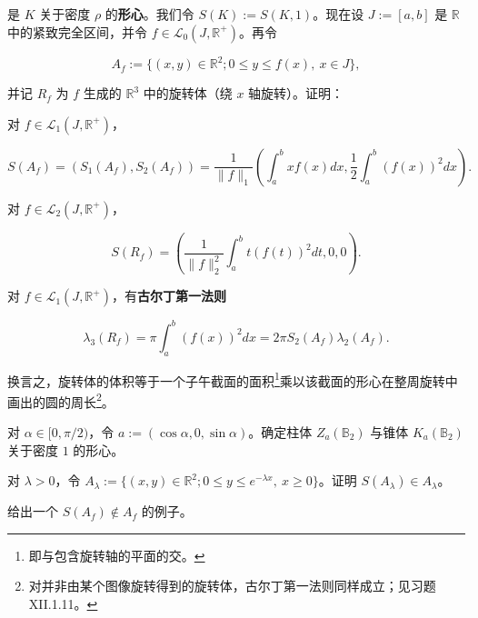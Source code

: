 \begin{exercises}
是 $ K $ 关于密度 $ \rho $ 的\textbf{形心}。我们令 $ S(K) := S(K,1) $。现在设 $ J := [a,b] $ 是 $ \mathbb{R} $ 中的紧致完全区间，并令 $ f \in \mathcal{L}_0(J, \mathbb{R}^+) $。再令

\[
A_f := \{ (x,y) \in \mathbb{R}^2 ; 0 \le y \le f(x),\ x \in J \} ,
\]

并记 $ R_f $ 为 $ f $ 生成的 $ \mathbb{R}^3 $ 中的旋转体（绕 $ x $ 轴旋转）。证明：

\begin{items}
\item

对 $ f \in \mathcal{L}_1(J, \mathbb{R}^+) $，

\[
S(A_f) = (S_1(A_f), S_2(A_f)) = \frac{1}{\|f\|_1} \left( \int_a^b xf(x) dx, \frac{1}{2}\int_a^b (f(x))^2 dx \right) .
\]
\item

对 $ f \in \mathcal{L}_2(J, \mathbb{R}^+) $，

\[
S(R_f) = \left( \frac{1}{\|f\|_2^2} \int_a^b t(f(t))^2 dt, 0, 0 \right) .
\]
\item

对 $ f \in \mathcal{L}_1(J, \mathbb{R}^+) $，有\textbf{古尔丁第一法则}

\[
\lambda_3(R_f) = \pi \int_a^b (f(x))^2 dx = 2\pi S_2(A_f)\lambda_2(A_f) .
\]

换言之，旋转体的体积等于一个子午截面的面积\footnote{即与包含旋转轴的平面的交。}乘以该截面的形心在整周旋转中画出的圆的周长\footnote{对并非由某个图像旋转得到的旋转体，古尔丁第一法则同样成立；见习题 XII.1.11。}。

\end{items}

\item

\begin{items}
\item

对 $ \alpha \in [0,\pi/2) $，令 $ a := (\cos\alpha, 0, \sin\alpha) $。确定柱体 $ Z_a(\mathbb{B}_2) $ 与锥体 $ K_a(\mathbb{B}_2) $ 关于密度 $ 1 $ 的形心。

\item

对 $ \lambda > 0 $，令 $ A_\lambda := \{ (x,y) \in \mathbb{R}^2 ; 0 \le y \le e^{-\lambda x},\ x \ge 0 \} $。证明 $ S(A_\lambda) \in A_\lambda $。

\item

给出一个 $ S(A_f) \notin A_f $ 的例子。

\end{items}


\end{exercises}
